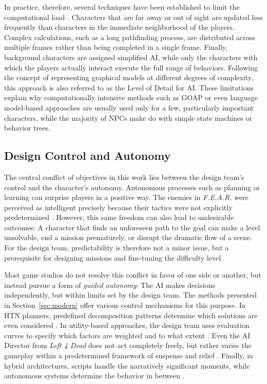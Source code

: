 In practice, therefore, several techniques have been established to limit the computational load \cite{millington2009}. Characters that are far away or out of sight are updated less frequently than characters in the immediate neighborhood of the players. Complex calculations, such as a long pathfinding process, are distributed across multiple frames rather than being completed in a single frame. Finally, background characters are assigned simplified AI, while only the characters with which the players actually interact execute the full range of behaviors. Following the concept of representing graphical models at different degrees of complexity, this approach is also referred to as the \glqq Level of Detail\grqq{} for AI. These limitations explain why computationally intensive methods such as GOAP or even language model-based approaches are usually used only for a few, particularly important characters, while the majority of NPCs make do with simple state machines or behavior trees.

\subsection{Design Control and Autonomy}

The central conflict of objectives in this work lies between the design team’s control and the character’s autonomy. Autonomous processes such as planning or learning can surprise players in a positive way. The enemies in \emph{F.E.A.R.} were perceived as intelligent precisely because their tactics were not explicitly predetermined \cite{orkin2006}. However, this same freedom can also lead to undesirable outcomes: A character that finds an unforeseen path to the goal can make a level unsolvable, end a mission prematurely, or disrupt the dramatic flow of a scene. For the design team, predictability is therefore not a minor issue, but a prerequisite for designing missions and fine-tuning the difficulty level.

Most game studios do not resolve this conflict in favor of one side or another, but instead pursue a form of \emph{guided autonomy}: The AI makes decisions independently, but within limits set by the design team. The methods presented in Section~\ref{sec:modern} offer various control mechanisms for this purpose. In HTN planners, predefined decomposition patterns determine which solutions are even considered \cite{humphreys2013}. In utility-based approaches, the design team uses evaluation curves to specify which factors are weighted and to what extent \cite{mark2009}. Even the AI Director from \emph{Left 4 Dead} does not act completely freely, but rather varies the gameplay within a predetermined framework of suspense and relief \cite{booth2009}. Finally, in hybrid architectures, scripts handle the narratively significant moments, while autonomous systems determine the behavior in between \cite{rabin2013}.

